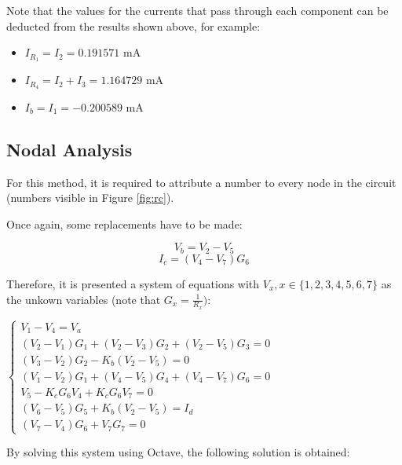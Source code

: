 \vspace{3mm}
\par Note that the values for the currents that pass through each component can be deducted from the results shown above, for example:

\begin{itemize}
  \item $I_{R_1}=I_2=0.191571$ mA
\item $I_{R_4}=I_2+I_3=1.164729$ mA
\item $I_b=I_1=-0.200589$ mA
 
  \end{itemize}



\vspace{5mm}
\subsection{Nodal Analysis}
\label{sec:2.2}

\vspace{3mm}
\par For this method, it is required to attribute a number to every node in the circuit (numbers visible in Figure \ref{fig:rc}).
\vspace{3mm}
\par Once again, some replacements have to be made:

\vspace{3mm}
\begin{equation}
  \label{eq6}
   V_b=V_2-V_5
\end{equation}
\begin{equation}
  \label{eq7}
   I_c=(V_4-V_7)G_6
\end{equation}

\vspace{3mm}
\par Therefore, it is presented a system of equations with $V_x , x\in{\{1,2,3,4,5,6,7\}}$ as the unkown variables (note that $G_x=\frac{1}{R_x})$:

\vspace{5mm}
\begin{center}
  $\begin{cases} V_1-V_4=V_a \\ (V_2-V_1)G_1+(V_2-V_3)G_2+(V_2-V_5)G_3=0  \\ (V_3-V_2)G_2-K_b(V_2-V_5)=0 \\ (V_1-V_2)G_1+(V_4-V_5)G_4+(V_4-V_7)G_6=0 \\ V_5-K_cG_6V_4+K_cG_6V_7=0\\(V_6-V_5)G_5+K_b(V_2-V_5)=I_d \\ (V_7-V_4)G_6+V_7G_7=0 \end{cases}$
  \end{center}
\vspace{5mm}
\par By solving this system using Octave, the following solution is obtained:

